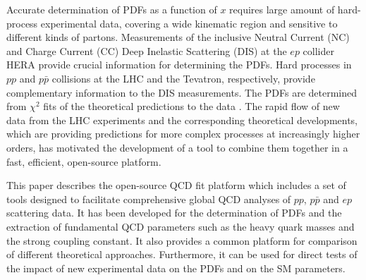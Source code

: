 Accurate determination of PDFs as a function of $x$ requires large amount of
hard-process experimental data, covering a wide kinematic region
and sensitive to different kinds of partons. Measurements of the inclusive Neutral Current (NC) and Charge Current (CC) Deep Inelastic Scattering (DIS) at the $ep$ collider HERA provide crucial information for determining the PDFs. Hard processes in $pp$ and $p \bar p$ collisions at the LHC and the Tevatron, respectively, 
provide complementary information to the DIS measurements.
 The PDFs are determined
from $\chi^2$ fits of the theoretical predictions to the 
data \cite{MSTWpdf,CT10pdf,NNPDFpdf,Alekhin:2013nda,Jimenez-Delgado:2014twa}. 
The rapid flow of new data from the LHC experiments and the corresponding theoretical developments, which are providing predictions for more complex processes at increasingly higher orders, has motivated the development of a tool to combine them  together in a fast, efficient, open-source platform.
%

This paper describes the open-source QCD fit platform \fitter which includes a set of tools designed to facilitate comprehensive global 
QCD analyses of $pp$, $p\bar{p}$ and $ep$ scattering data. 
It has been developed for the determination of PDFs and the extraction of fundamental QCD parameters such as the heavy
quark masses and the strong coupling constant. It also provides a common platform for 
comparison of different theoretical approaches. Furthermore, it can be used for direct tests of the impact 
of new experimental data on the PDFs and on the SM parameters.

